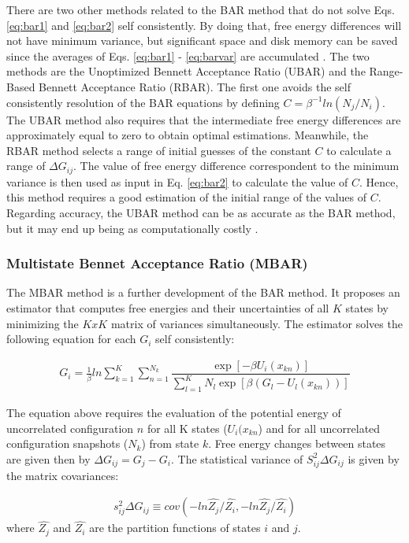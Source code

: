 There are two other methods related to the BAR method that do not solve Eqs. \eqref{eq:bar1} and \eqref{eq:bar2} self consistently. By doing that, free energy differences will not have minimum variance, but significant space and disk memory can be saved since the averages of Eqs. \eqref{eq:bar1} - \eqref{eq:barvar} are accumulated \cite{bareva}. The two methods are the Unoptimized Bennett Acceptance Ratio (UBAR) and the Range-Based Bennett Acceptance Ratio (RBAR). The first one avoids the self consistently resolution of the BAR equations by defining $C=\beta^{-1}ln(N_{j}/N_{i})$. The UBAR method also requires that the intermediate free energy differences are approximately equal to zero to obtain optimal estimations. Meanwhile, the RBAR method selects a range of initial guesses of the constant $C$ to calculate a range of $\Delta G_{ij}$. The value of free energy difference correspondent to the minimum variance is then used as input in Eq. \eqref{eq:bar2} to calculate the value of $C$. Hence, this method requires a good estimation of the initial range of the values of $C$. Regarding accuracy, the UBAR method can be as accurate as the BAR method, but it may end up being as computationally costly \cite{bareva}.  

\subsubsection{Multistate Bennet Acceptance Ratio (MBAR)}

The MBAR method \cite{mbar} is a further development of the BAR method. It proposes an estimator that computes free energies and their uncertainties of all $K$ states  by minimizing the $KxK$ matrix of variances simultaneously. The estimator solves the following equation for each $G_{i}$ self consistently:

\begin{equation}
\label{eq:mbar}
\begin{aligned}
G_{i} = \frac{1}{\beta}ln \sum_{k=1}^{K} \sum_{n=1}^{N_{k}}
\dfrac{\exp[-\beta U_{i}(x_{kn})]}{\sum_{l=1}^{K} N_{l} \exp[\beta (G_{l} - U_{l}(x_{kn}))]}
\end{aligned}
\end{equation}

The equation above requires the evaluation of the potential energy  of uncorrelated configuration $n$ for all K states ($U_{i}(x_{kn}$) and for all uncorrelated configuration snapshots ($N_{k}$) from state $k$. Free energy changes between states are given then by $\Delta G_{ij} = G_{j} -  G_{i}$. The statistical variance of $S_{ij}^{2} \Delta G_{ij}$ is given by the matrix covariances:

\begin{equation}
\label{eq:varmbar}
\begin{aligned}
s_{ij}^{2} \Delta G_{ij} \equiv cov (-ln \hat{Z_{j}}/\hat{Z_{i}},-ln \hat{Z_{j}}/\hat{Z_{i}})
\end{aligned}
\end{equation}
where $\hat{Z_{j}}$ and $\hat{Z_{i}}$ are the partition functions of states $i$ and $j$. 
